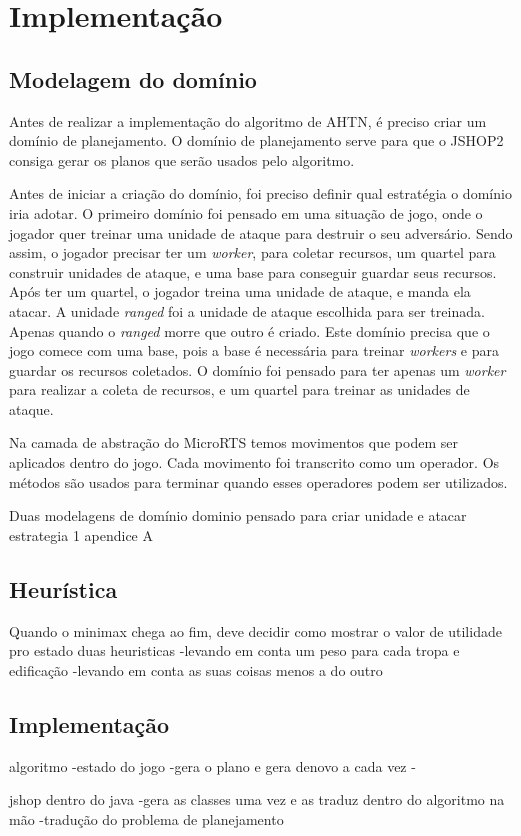 
\chapter{\label{chap:impl}Implementação}

\section{Modelagem do domínio}

Antes de realizar a implementação do algoritmo de AHTN, é preciso criar um domínio de planejamento. 
O domínio de planejamento serve para que o JSHOP2 consiga gerar os planos que serão usados pelo algoritmo.

Antes de iniciar a criação do domínio, foi preciso definir qual estratégia o domínio iria adotar.
O primeiro domínio foi pensado em uma situação de jogo, onde o jogador quer treinar uma unidade de ataque para destruir o seu adversário.
Sendo assim, o jogador precisar ter um \textit{worker}, para coletar recursos, um quartel para construir unidades de ataque, e uma base para conseguir guardar seus recursos. 
Após ter um quartel, o jogador treina uma unidade de ataque, e manda ela atacar.
A unidade \textit{ranged} foi a unidade de ataque escolhida para ser treinada.
Apenas quando o \textit{ranged} morre que outro é criado.
Este domínio precisa que o jogo comece com uma base, pois a base é necessária para treinar \textit{workers} e para guardar os recursos coletados.  
O domínio foi pensado para ter apenas um \textit{worker} para realizar a coleta de recursos, e um quartel para treinar as unidades de ataque.

Na camada de abstração do MicroRTS temos movimentos que podem ser aplicados dentro do jogo. 
Cada movimento foi transcrito como um operador.
Os métodos são usados para terminar quando esses operadores podem ser utilizados.



Duas modelagens de domínio 
dominio pensado para criar unidade e atacar
estrategia 1
apendice A

\section{Heurística}

Quando o minimax chega ao fim, deve decidir como mostrar o valor de utilidade pro estado
duas heuristicas
	-levando em conta um peso para cada tropa e edificação
	-levando em conta as suas coisas menos a do outro

\section{Implementação}

algoritmo
	-estado do jogo
	-gera o plano e gera denovo a cada vez
	-

jshop dentro do java
	-gera as classes uma vez e as traduz dentro do algoritmo na mão
	-tradução do problema de planejamento
	

